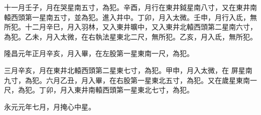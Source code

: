 \begin{pinyinscope}
 十一月壬子，月在哭星南五寸，為犯。辛酉，月行在東井鉞星南八寸，又在東井南轅西頭第一星南五寸，並為犯。進入井中。丁卯，月入太微。壬申，月行入氐，無所犯。十二月辛巳，月入羽林，又入東井曠中，又入東井北轅西頭第二星南六寸，為犯。乙未，月入太微，在右執法星東北二尺，無所犯。乙亥，月入氐，無所犯。



 隆昌元年正月辛亥，月入畢，在左股第一星東南一尺，為犯。



 三月辛亥，月在東井北轅西頭第二星東七寸，為犯。甲申，月入太微，在
 屏星南九寸，為犯。六月乙丑，月入畢，在右股第一星東北五寸，為犯。又在歲星東南一尺，為犯。丁卯，月入東井南轅西頭第一星東北七寸，為犯。



 永元元年七月，月掩心中星。



\end{pinyinscope}